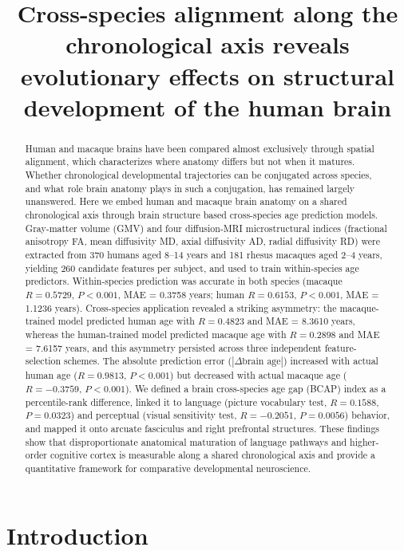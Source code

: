 \documentclass[11pt]{article}
\title{Cross-species alignment along the chronological axis reveals evolutionary effects on structural development of the human brain}
\author{}
\date{}
\begin{document}
\maketitle

\begin{abstract}
Human and macaque brains have been compared almost exclusively through spatial alignment, which characterizes where anatomy differs but not when it matures. Whether chronological developmental trajectories can be conjugated across species, and what role brain anatomy plays in such a conjugation, has remained largely unanswered. Here we embed human and macaque brain anatomy on a shared chronological axis through brain structure based cross-species age prediction models. Gray-matter volume (GMV) and four diffusion-MRI microstructural indices (fractional anisotropy FA, mean diffusivity MD, axial diffusivity AD, radial diffusivity RD) were extracted from 370 humans aged 8--14 years and 181 rhesus macaques aged 2--4 years, yielding 260 candidate features per subject, and used to train within-species age predictors. Within-species prediction was accurate in both species (macaque $R = 0.5729$, $P < 0.001$, MAE = 0.3758 years; human $R = 0.6153$, $P < 0.001$, MAE = 1.1236 years). Cross-species application revealed a striking asymmetry: the macaque-trained model predicted human age with $R = 0.4823$ and MAE = 8.3610 years, whereas the human-trained model predicted macaque age with $R = 0.2898$ and MAE = 7.6157 years, and this asymmetry persisted across three independent feature-selection schemes. The absolute prediction error ($|\Delta \text{brain age}|$) increased with actual human age ($R = 0.9813$, $P < 0.001$) but decreased with actual macaque age ($R = -0.3759$, $P < 0.001$). We defined a brain cross-species age gap (BCAP) index as a percentile-rank difference, linked it to language (picture vocabulary test, $R = 0.1588$, $P = 0.0323$) and perceptual (visual sensitivity test, $R = -0.2051$, $P = 0.0056$) behavior, and mapped it onto arcuate fasciculus and right prefrontal structures. These findings show that disproportionate anatomical maturation of language pathways and higher-order cognitive cortex is measurable along a shared chronological axis and provide a quantitative framework for comparative developmental neuroscience.
\end{abstract}

\section{Introduction}
\end{document}
